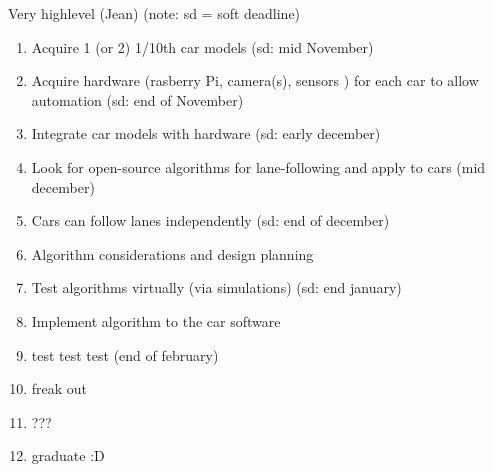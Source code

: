 \documentclass [12pt]{article}
\begin{document}
																																																					  Very highlevel (Jean)
																																																					  (note:  sd = soft deadline)
																																																					  \begin{enumerate}
																																																					  	
																																																							\item Acquire 1 (or 2) 1/10th car models (sd: mid November)
																																																								\item Acquire hardware (rasberry Pi, camera(s), sensors ) for each car to allow automation (sd: end of November)
																																																									\item Integrate car models with hardware (sd: early december)
																																																										\item Look for open-source algorithms for lane-following and apply to cars (mid december)
																																																											\item Cars can follow lanes independently (sd: end of december)

																																																												\item Algorithm considerations and design planning
																																																													\item Test algorithms virtually (via simulations) (sd:  end january)
																																																														\item Implement algorithm to the car software 
																																																															\item test test test (end of february)

																																																																\item freak out 
																																																																	\item ??? 
																																																																		
																																																																			\item graduate :D



																																																																			\end{enumerate}
\end{document}

